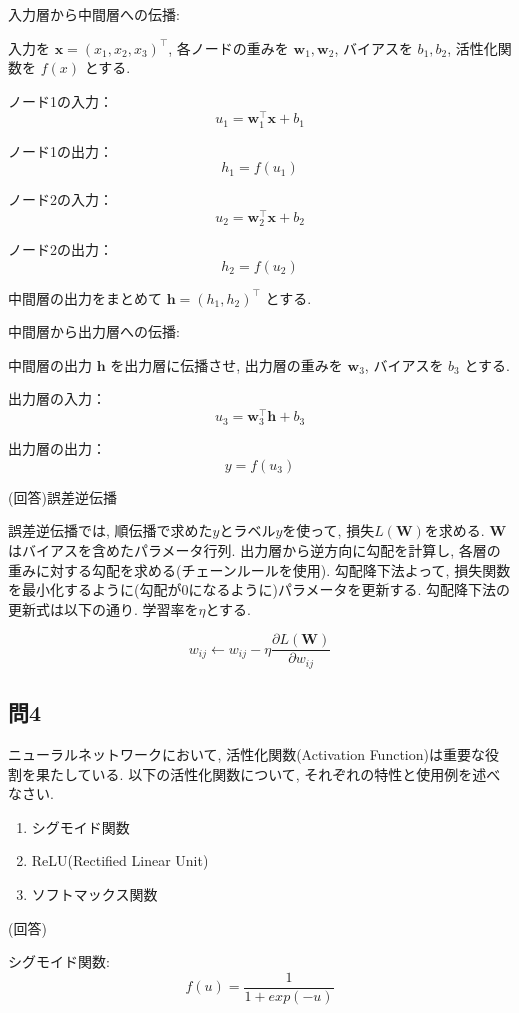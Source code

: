 \documentclass[dvipdfmx, 10pt]{jsarticle}
\begin{document}
\begin{oframed}
入力層から中間層への伝播: 

入力を $\mathbf{x} = (x_1, x_2, x_3)^{\top}$, 各ノードの重みを $\mathbf{w}_1, \mathbf{w}_2$, バイアスを $b_1, b_2$, 活性化関数を $f(x)$ とする. 

ノード1の入力：
\[
u_1 = \mathbf{w}_1^{\top} \mathbf{x} + b_1
\]

ノード1の出力：
\[
h_1 = f(u_1)
\]

ノード2の入力：
\[
u_2 = \mathbf{w}_2^{\top} \mathbf{x} + b_2
\]

ノード2の出力：
\[
h_2 = f(u_2)
\]

中間層の出力をまとめて $\mathbf{h} = (h_1, h_2)^{\top}$ とする. 

中間層から出力層への伝播:

中間層の出力 $\mathbf{h}$ を出力層に伝播させ, 出力層の重みを $\mathbf{w}_3$, バイアスを $b_3$ とする. 

出力層の入力：
\[
u_3 = \mathbf{w}_3^{\top} \mathbf{h} + b_3
\]

出力層の出力：
\[
y = f(u_3)
\]
\end{oframed}

(回答)誤差逆伝播

誤差逆伝播では, 順伝播で求めた$\hat{y}$とラベル$y$を使って, 損失$L(\mathbf{W})$を求める. $\mathbf{W}$はバイアスを含めたパラメータ行列. 
出力層から逆方向に勾配を計算し, 各層の重みに対する勾配を求める(チェーンルールを使用). 
勾配降下法よって, 損失関数を最小化するように(勾配が$0$になるように)パラメータを更新する. 
勾配降下法の更新式は以下の通り. 学習率を$\eta$とする. 

\[
w_{ij} \leftarrow w_{ij} - \eta \frac{\partial L(\mathbf{W})}{\partial w_{ij}}
\]

\subsection*{問4}
ニューラルネットワークにおいて, 活性化関数(Activation Function)は重要な役割を果たしている. 以下の活性化関数について, それぞれの特性と使用例を述べなさい.   
\begin{enumerate}
    \item シグモイド関数
    \item ReLU(Rectified Linear Unit)
    \item ソフトマックス関数
\end{enumerate}

(回答)

シグモイド関数: 
\[
f(u) = \frac{1}{1 + exp(-u)}
\]
\end{document}
